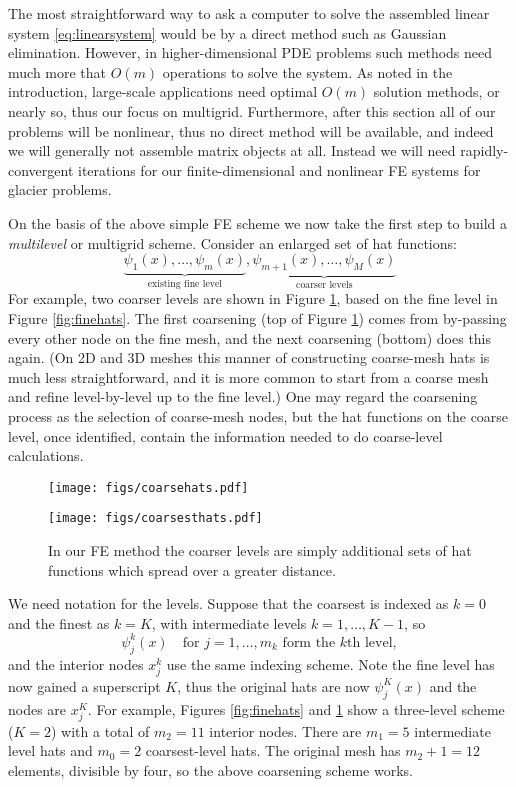 \documentclass[letterpaper,final,12pt,reqno]{amsart}
\begin{document}
The most straightforward way to ask a computer to solve the assembled linear system \eqref{eq:linearsystem} would be by a direct method such as Gaussian elimination.  However, in higher-dimensional PDE problems such methods need much more that $O(m)$ operations to solve the system.  As noted in the introduction, large-scale applications need optimal $O(m)$ solution methods, or nearly so, thus our focus on multigrid.  Furthermore, after this section all of our problems will be nonlinear, thus no direct method will be available, and indeed we will generally not assemble matrix objects at all.  Instead we will need rapidly-convergent iterations for our finite-dimensional and nonlinear FE systems for glacier problems.

On the basis of the above simple FE scheme we now take the first step to build a \emph{multilevel} or multigrid scheme.  Consider an enlarged set of hat functions:
    $$\underbrace{\psi_1(x),\dots,\psi_m(x)}_{\text{existing fine level}},\underbrace{\psi_{m+1}(x),\dots,\psi_M(x)}_{\text{coarser levels}}$$
For example, two coarser levels are shown in Figure \ref{fig:coarsehats}, based on the fine level in Figure \ref{fig:finehats}.  The first coarsening (top of Figure \ref{fig:coarsehats}) comes from by-passing every other node on the fine mesh, and the next coarsening (bottom) does this again.  (On 2D and 3D meshes this manner of constructing coarse-mesh hats is much less straightforward, and it is more common to start from a coarse mesh and refine level-by-level up to the fine level.)  One may regard the coarsening process as the selection of coarse-mesh nodes, but the hat functions on the coarse level, once identified, contain the information needed to do coarse-level calculations.

\begin{figure}
\texttt{[image: figs/coarsehats.pdf]}
\smallskip

\texttt{[image: figs/coarsesthats.pdf]}
\caption{In our FE method the coarser levels are simply additional sets of hat functions which spread over a greater distance.}
\label{fig:coarsehats}
\end{figure}

We need notation for the levels.  Suppose that the coarsest is indexed as $k=0$ and the finest as $k=K$, with intermediate levels $k=1,\dots,K-1$, so
\begin{equation}
  \psi_j^k(x) \quad \text{for } j=1,\dots,m_k \text{ form the $k$th level},  \label{eq:definepsijk}
\end{equation}
and the interior nodes $x_j^k$ use the same indexing scheme.  Note the fine level has now gained a superscript $K$, thus the original hats are now $\psi_j^K(x)$ and the nodes are $x_j^K$.  For example, Figures \ref{fig:finehats} and \ref{fig:coarsehats} show a three-level scheme ($K=2$) with a total of $m_2=11$ interior nodes.  There are $m_1=5$ intermediate level hats and $m_0=2$ coarsest-level hats.  The original mesh has $m_2+1=12$ elements, divisible by four, so the above coarsening scheme works.
\end{document}
